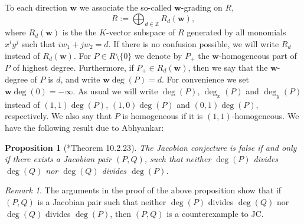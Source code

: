 \documentclass[reqno,a4paper]{amsart}
\newtheorem{proposition}[theorem]{Proposition}
\theoremstyle{definition}
\theoremstyle{remark}
\newtheorem{remark}[theorem]{Remark}
\begin{document}
\smallskip

To each direction $\mathbf{w}$ we associate the so-called $\mathbf{w}$-grading on $R$,
$$
R:= \bigoplus_{d\in \mathds{Z}} R_d(\mathbf{w}),
$$
where $R_d(\mathbf{w})$ is the the $K$-vector subspace of $R$ generated by all monomials
$x^iy^j$ such that $i w_1 + j w_2 = d$. If there is no confusion possible, we will write
$R_d$ instead of $R_d(\mathbf{w})$. For $P \in R\setminus\{0\}$ we denote by $P_+$ the
$\mathbf{w}$-homogeneous part of $P$ of highest degree. Furthermore, if
$P_+\in R_d(\mathbf{w})$, then we say that the $\mathbf{w}$-degree of $P$ is $d$, and write
$\mathbf{w}\!\deg(P) = d$. For convenience we set $\mathbf{w}\!\deg(0) = -\infty$. As usual
we will write $\deg(P)$, $\deg_x(P)$ and $\deg_y(P)$ instead of $(1,1)\!\deg(P)$,
$(1,0)\!\deg(P)$ and $(0,1)\!\deg(P)$, respectively. We also say that $P$ is homogeneous
if it is $(1,1)$-homogeneous. We have the
following result due to Abhyankar:

\begin{proposition}[\cite{vdE}*{Theorem 10.2.23}]\label{contraejemplo subrectangular}
The Jacobian conjecture is false if and only if there exists a Jacobian pair $(P,Q)$,
such that neither $\deg(P)$ divides $\deg(Q)$ nor $\deg(Q)$ divides $\deg(P)$.
\end{proposition}

\begin{remark}\label{re 1.2} The arguments in the proof of the above proposition show that
if $(P,Q)$ is a Jacobian pair such that neither $\deg(P)$ divides $\deg(Q)$ nor $\deg(Q)$
divides $\deg(P)$, then $(P,Q)$ is a counterexample to JC.
\end{remark}
\end{document}
